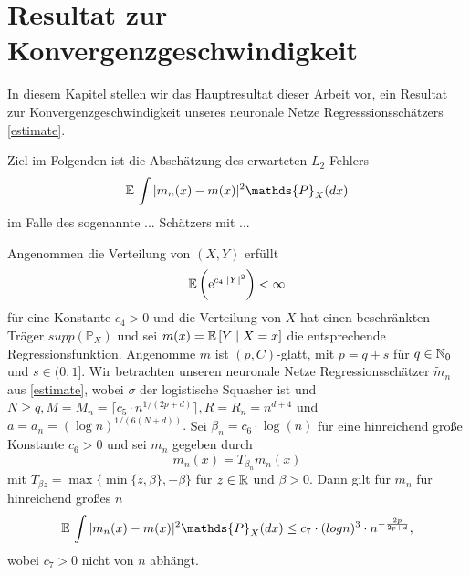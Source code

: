 \chapter{Resultat zur Konvergenzgeschwindigkeit}
\label{chap:3}

In diesem Kapitel stellen wir das Hauptresultat dieser Arbeit vor, ein Resultat zur Konvergenzgeschwindigkeit unseres neuronale Netze Regresssionsschätzers \ref{estimate}.

Ziel im Folgenden ist die Abschätzung des erwarteten $L_2$-Fehlers 
$$\E \int |m_n(x) - m(x)|^2  \mathds{P}_X(dx)$$
im Falle des sogenannte ... Schätzers mit ... 

\begin{thm}\label{optstop}
Angenommen die Verteilung von $(X,Y)$ erfüllt 
$$ \mathbb{E}\,\bigg(\mathrm{e}^{c_4 \cdot |Y|^2}\bigg) < \infty$$
für eine Konstante $c_4 > 0$ und die Verteilung von $X$ hat einen beschränkten Träger $supp(\mathds{P}_X)$ und sei $m(x) = \mathbb{E}\,[Y \mid X = x]$ die entsprechende Regressionsfunktion. 
Angenomme $m$ ist $(p,C)$-glatt, mit $p = q + s$ für $q \in \mathbb{N}_0$ und $s \in (0,1].$ Wir betrachten unseren neuronale Netze Regressionsschätzer $\tilde{m}_n$ aus \ref{estimate}, wobei $\sigma$ der logistische Squasher ist und $N \geq q, M = M_n = \lceil c_5 \cdot n^{1/(2p + d)}\rceil, R = R_n = n^{d + 4}$ und $a = a_n = (\log n)^{1/(6(N + d))}.$
Sei $\beta_n = c_6 \cdot \log(n)$ für eine hinreichend große Konstante $c_6 > 0$ und sei $m_n$ gegeben durch
$$m_n(x) = T_{\beta_n}\tilde{m}_n (x)$$
mit $T_{\beta z} = \max\{\min\{z, \beta\}, -\beta\}$ für $z \in \mathbb{R}$ und $\beta > 0.$ Dann gilt für $m_n$ für hinreichend großes $n$
$$\E \int |m_n(x) - m(x)|^2  \mathds{P}_X(dx) \leq c_7 \cdot (log n)^3 \cdot n^{- \frac{2p}{2p + d}},$$
wobei $c_7 > 0$ nicht von $n$ abhängt.
\end{thm}
